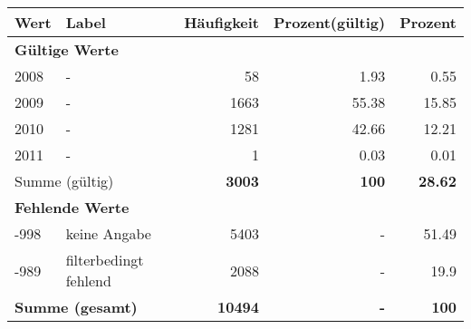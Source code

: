      \begin{longtable}{lXrrr}
     \toprule
     \textbf{Wert} & \textbf{Label} & \textbf{Häufigkeit} & \textbf{Prozent(gültig)} & \textbf{Prozent} \\
     \endhead
     \midrule
     \multicolumn{5}{l}{\textbf{Gültige Werte}}\\

     2008 &
     \multicolumn{1}{X}{ -  } &


       \num{58} &
       \num[round-mode=places,round-precision=2]{1.93} &
         \num[round-mode=places,round-precision=2]{0.55} \\

     2009 &
     \multicolumn{1}{X}{ -  } &


       \num{1663} &
       \num[round-mode=places,round-precision=2]{55.38} &
         \num[round-mode=places,round-precision=2]{15.85} \\

     2010 &
     \multicolumn{1}{X}{ -  } &


       \num{1281} &
       \num[round-mode=places,round-precision=2]{42.66} &
         \num[round-mode=places,round-precision=2]{12.21} \\

     2011 &
     \multicolumn{1}{X}{ -  } &


       \num{1} &
       \num[round-mode=places,round-precision=2]{0.03} &
         \num[round-mode=places,round-precision=2]{0.01} \\
     \midrule
     \multicolumn{2}{l}{Summe (gültig)} &
       \textbf{\num{3003}} &
     \textbf{\num{100}} &
       \textbf{\num[round-mode=places,round-precision=2]{28.62}} \\
     \multicolumn{5}{l}{\textbf{Fehlende Werte}}\\
       -998 &
       keine Angabe &
         \num{5403} &
        - &
         \num[round-mode=places,round-precision=2]{51.49} \\
       -989 &
       filterbedingt fehlend &
         \num{2088} &
        - &
         \num[round-mode=places,round-precision=2]{19.9} \\
     \midrule
     \multicolumn{2}{l}{\textbf{Summe (gesamt)}} &
          \textbf{\num{10494}} &
        \textbf{-} &
        \textbf{\num{100}} \\
     \bottomrule
     \end{longtable}
     
